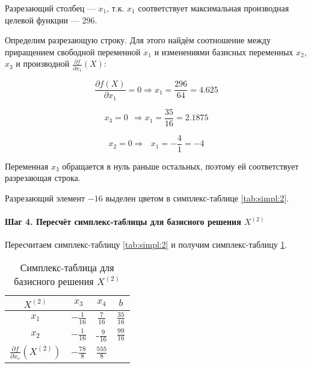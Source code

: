 Разрезающий столбец --- $x_1$, т.к. $x_1$ соответствует максимальная производная целевой функции --- 296.

Определим разрезающую строку. Для этого найдём соотношение между приращением свободной переменной $x_1$ и изменениями базисных переменных $x_2$, $x_3$ и производной $\frac{\partial f}{\partial x_1} \left(X \right)$:

\begin{equation*}
	\frac{\partial f(X)}{\partial x_1} = 0 \Rightarrow x_1 = \frac{296}{64} = 4.625
\end{equation*}

\begin{equation*}
	x_3 = 0\ \ \Rightarrow x_1 = \frac{35}{16} = 2.1875
\end{equation*}

\begin{equation*}
	x_2 = 0 \Rightarrow \ \ \ x_1 = -\frac{4}{1} = -4
\end{equation*}

Переменная $x_3$ обращается в нуль раньше остальных, поэтому ей соответствует разрезающая строка.

Разрезающий элемент $-16$ выделен цветом в симплекс-таблице \ref{tab:simpl:2}. 

\paragraph{Шаг 4. Пересчёт симплекс-таблицы для базисного решения $X^{(2)}$}

Пересчитаем симплекс-таблицу \ref{tab:simpl:2} и получим симплекс-таблицу \ref{tab:simpl:3}.

\begin{table}[H]
\begin{center}
	\caption{Симплекс-таблица для базисного решения $X^{(2)}$}
	\label{tab:simpl:3}
	\def\tabcolsep{18pt}
	\def\arraystretch{1.5}
	\fontsize{13}{14}\selectfont
	\begin{tabular}{|c|c||c||c|}
		\hline 
		$X^{(2)}$ & $x_3$ & $x_4$ & $b$ \\ 
		\hline
		$x_1$ & $-\frac{1}{16}$ & $\frac{7}{16}$ & $\frac{35}{16}$ \\ 
		\hline
		$x_2$ & $-\frac{1}{16}$ & -$\frac{9}{16}$ & $\frac{99}{16}$ \\ 
		\hline
		$\frac{\partial f}{\partial x_r} \left(X^{(2)} \right)$ & $-\frac{78}{8}$ & $\frac{555}{8}$ &  \\ 
		\hline 
	\end{tabular} 
\end{center}
\end{table}

